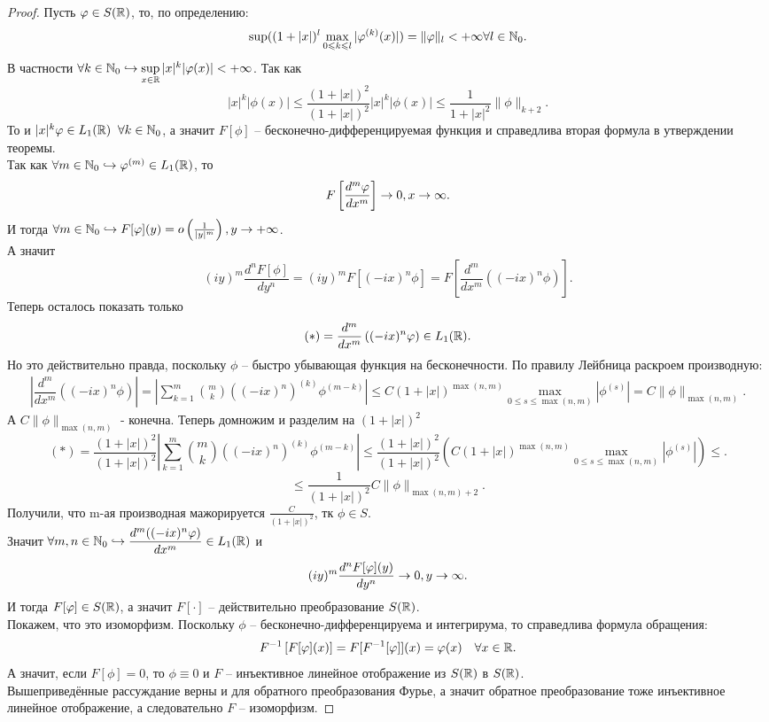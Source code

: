 \begin{proof}
    Пусть $\varphi \in S(\mathbb{R})$, то, по определению:
    \[
        \sup ((1 + |x|)^l \max\limits_{0 \leqslant k \leqslant l} |\varphi^{(k)}(x)|) = \|\varphi\|_l < +\infty \forall l \in \mathbb{N}_0.
    \]
    В частности $\forall k \in \mathbb{N}_0 \hookrightarrow \sup\limits_{x \in \mathbb{R}} |x|^k|\varphi (x)| < +\infty$.
    Так как
    \[
        |x|^k|\phi(x)| \leq \dfrac{(1 + |x|)^2}{(1 + |x|)^2} |x|^k|\phi(x)| \leq \dfrac{1}{1 + |x|^2} \|\phi\|_{k + 2}.
    \]
    То и $|x|^k\varphi \in L_1(\mathbb{R}) \;\; \forall k \in \mathbb{N}_0$, а значит $F[\phi]$ -- бесконечно-дифференцируемая функция и справедлива вторая формула в утверждении теоремы. \\
    Так как $\forall m \in \mathbb{N}_0 \hookrightarrow \varphi^{(m)} \in L_1(\mathbb{R})$, то
    \[
        F\left[\dfrac{d^m \varphi}{dx^m}\right] \rightarrow 0, x \rightarrow \infty.
    \]
    И тогда $\forall m \in \mathbb{N}_0 \hookrightarrow F[\varphi](y) = o\left(\frac{1}{|y|^m}\right), y \rightarrow +\infty$. \\
    А значит
    \[
        (iy)^m \dfrac{d^n F[\phi]}{dy^n} = (iy)^m F[(-ix)^n \phi] = F\left[\dfrac{d^m}{dx^m}((-ix)^n \phi)\right].
    \]
    Теперь осталось показать только
    \[
        (*) = \dfrac{d^m}{dx^m}\left((-ix)^n \varphi\right) \in L_1(\mathbb{R}).
    \]
    Но это действительно правда, поскольку $\phi$ -- быстро убывающая функция на бесконечности. По правилу Лейбница раскроем производную:
    \begin{multline*}
        \left|\dfrac{d^m}{dx^m}((-ix)^n \phi)\right| = \left|\sum\limits_{k = 1}^m \binom{m}{k}((-ix)^n)^{(k)} \phi^{(m - k)}\right| \leq C (1 + |x|)^{\max(n, m)}\max\limits_{0 \leq s \leq \max(n,m)} |\phi^{(s)}| = C \|\phi\|_{\max(n,m)}.
    \end{multline*}
    А $C \|\phi\|_{\max(n,m)}$ - конечна. Теперь домножим и разделим на $(1 + |x|)^2$
    \[
        (*) = \frac{(1 + |x|)^2}{(1 + |x|)^2} \left|\sum\limits_{k = 1}^m \binom{m}{k}((-ix)^n)^{(k)} \phi^{(m - k)}\right| \leq \frac{(1 + |x|)^2}{(1 + |x|)^2} \left(C (1 + |x|)^{\max(n, m)}\max\limits_{0 \leq s \leq \max(n,m)} |\phi^{(s)}|\right) \leq.
    \]
    \[
        \leq \frac{1}{(1 + |x|)^2} C \|\phi\|_{\max(n,m)+2}.
    \]
    Получили, что m-ая производная мажорируется $\frac{C}{(1+|x|)^2}$, тк $\phi \in S$. \\ Значит $\forall m, n \in \mathbb{N}_0 \hookrightarrow \dfrac{d^m ((-ix)^n \varphi)}{dx^m} \in L_1(\mathbb{R})$ и
    \[
        (iy)^m \dfrac{d^n F[\varphi](y)}{dy^n} \rightarrow 0, y \rightarrow \infty.
    \]
    И тогда $F[\varphi] \in S(\mathbb{R})$, а значит $F[\cdot]$ -- действительно преобразование $S(\mathbb{R})$. \\
    Покажем, что это изоморфизм.
    Поскольку $\phi$ -- бесконечно-дифференцируема и интегрирума, то справедлива формула обращения:
    \[
        F^{-1}\left[F[\varphi](x)\right] = F[F^{-1}[\varphi]](x) = \varphi(x) \quad \forall x \in \mathbb{R}.
    \]
    А значит, если $F[\phi] = 0$, то $\phi \equiv 0$ и $F$ -- инъективное линейное отображение из $S(\mathbb{R})$ в $S(\mathbb{R})$. \\
    Вышеприведённые рассуждание верны и для обратного преобразования Фурье, а значит обратное преобразование тоже инъективное линейное отображение, а следовательно $F$ -- изоморфизм.
\end{proof}
